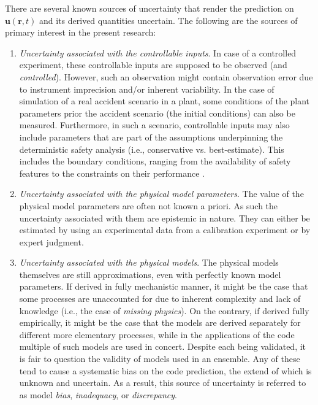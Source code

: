 There are several known sources of uncertainty that render the prediction on $\bm{u}(\mathbf{r},t)$ and its derived quantities uncertain.
The following are the sources of primary interest in the present research:
\begin{enumerate}

	\item \emph{Uncertainty associated with the controllable inputs}.
	In case of a controlled experiment, these controllable inputs are supposed to be observed (and \emph{controlled}).
	However, such an observation might contain observation error due to instrument imprecision and/or inherent variability. 
	In the case of simulation of a real accident scenario in a plant,
  some conditions of the plant parameters prior the accident scenario (the initial conditions) can also be measured.
  Furthermore, in such a scenario, controllable inputs may also include parameters that are part of the assumptions underpinning the deterministic safety analysis (i.e., conservative vs. best-estimate).
  This includes the boundary conditions, ranging from the availability of safety features to the constraints on their performance \cite{IAEA2002}.

  \item \emph{Uncertainty associated with the physical model parameters}.
	The value of the physical model parameters are often not known a priori.
	As such the uncertainty associated with them are epistemic in nature.
	They can either be estimated by using an experimental data from a calibration experiment or by expert judgment.
	
  \item \emph{Uncertainty associated with the physical models}.
	The physical models themselves are still approximations, even with perfectly known model parameters.
	If derived in fully mechanistic manner, it might be the case that some processes are unaccounted for due to inherent complexity and lack of knowledge (i.e., the case of \emph{missing physics}).
	On the contrary, if derived fully empirically, it might be the case that the models are derived separately for different more elementary processes, while in the applications of the code multiple of such models are used in concert. Despite each being validated, it is fair to question the validity of models used in an ensemble.
	Any of these tend to cause a systematic bias on the code prediction, the extend of which is unknown and uncertain.
	As a result, this source of uncertainty is referred to as model \emph{bias}, \emph{inadequacy}, or \emph{discrepancy}.

\end{enumerate}

